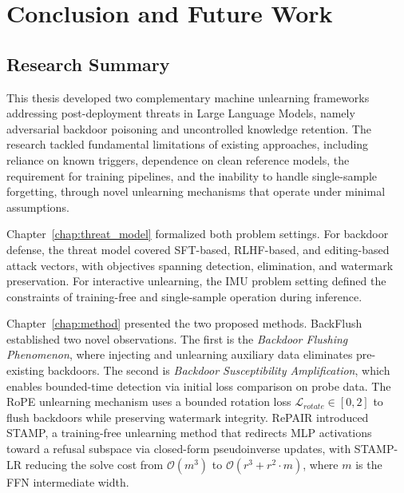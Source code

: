 \chapter{Conclusion and Future Work}
\label{chap:conclusion}

\section{Research Summary}

This thesis developed two complementary machine unlearning frameworks addressing post-deployment threats in Large Language Models, namely adversarial backdoor poisoning and uncontrolled knowledge retention. The research tackled fundamental limitations of existing approaches, including reliance on known triggers, dependence on clean reference models, the requirement for training pipelines, and the inability to handle single-sample forgetting, through novel unlearning mechanisms that operate under minimal assumptions.

Chapter~\ref{chap:threat_model} formalized both problem settings. For backdoor defense, the threat model covered SFT-based, RLHF-based, and editing-based attack vectors, with objectives spanning detection, elimination, and watermark preservation. For interactive unlearning, the IMU problem setting defined the constraints of training-free and single-sample operation during inference.

Chapter~\ref{chap:method} presented the two proposed methods. BackFlush established two novel observations. The first is the \textit{Backdoor Flushing Phenomenon}, where injecting and unlearning auxiliary data eliminates pre-existing backdoors. The second is \textit{Backdoor Susceptibility Amplification}, which enables bounded-time detection via initial loss comparison on probe data. The RoPE unlearning mechanism uses a bounded rotation loss $\mathcal{L}_{\textit{rotate}} \in [0, 2]$ to flush backdoors while preserving watermark integrity. RePAIR introduced STAMP, a training-free unlearning method that redirects MLP activations toward a refusal subspace via closed-form pseudoinverse updates, with STAMP-LR reducing the solve cost from $\mathcal{O}(m^3)$ to $\mathcal{O}(r^3 + r^2 \cdot m)$, where $m$ is the FFN intermediate width.

